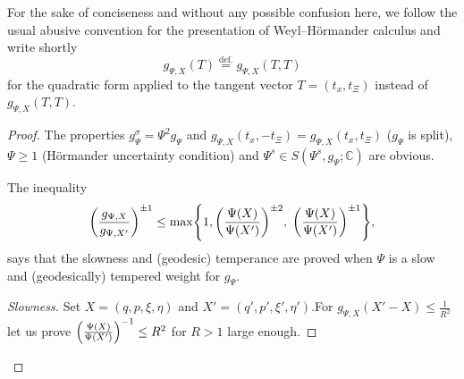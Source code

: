 \documentclass[10pt]{amsart}
\theoremstyle{definition}\newtheorem{defi}[theo]{Definition}\newtheorem{rema}[theo]{Remark}\newtheorem{exam}[theo]{Example}\newtheorem{exem}[theo]{Example}\newtheorem{nota}[theo]{Notation}
\newcommand{\C}{\mathbb{C}}
\let\originalleft\left
\let\originalright\right
\renewcommand{\left}{\mathopen{}\mathclose\bgroup\originalleft}
\renewcommand{\right}{\aftergroup\egroup\originalright}
\begin{document}
For the sake of conciseness and without any possible confusion here, we follow the usual abusive convention for the presentation of Weyl--H\"ormander calculus and write shortly
\[
g_{\Psi,X}(T)
\overset{\text{def.}}=g_{\Psi,X}(T,T)
\]
for the quadratic form applied to the tangent vector $T=(t_{x},t_{\Xi})$ instead of $g_{\Psi,X}(T,T)$.
\begin{proof}
The properties $g^{\sigma}_{\Psi}=\Psi^{2}g_{\Psi}$ and $g_{\Psi,X}(t_{x},-t_{\Xi})=g_{\Psi,X}(t_{x},t_{\Xi})$ ($g_{\Psi}$ is split), $\Psi\geq 1$ (H\"ormander uncertainty condition) and $\Psi^{s}\in S(\Psi^{s},g_{\Psi};\C)$ are obvious.

The inequality
\begin{equation}\label{eq:rappgXgXprime}
\left(\frac{g_{\Psi,X}}{g_{\Psi,X'}}\right)^{\pm 1}\leq \max \left\{1,\left(\frac{\Psi(X)}{\Psi(X')}\right)^{\pm 2},\; \left(\frac{\Psi(X)}{\Psi(X')}\right)^{\pm 1}\right\},
\end{equation}
says that the slowness and (geodesic) temperance are proved when $\Psi$ is a slow and (geodesically) tempered weight for $g_{\Psi}$.

\begin{proof}[{Slowness}]
Set $X=(q,p,\xi,\eta)$ and $X'=(q',p',\xi',\eta')$.For $g_{\Psi,X}(X'-X)\leq \frac{1}{R^{2}}$ let us prove $\left(\frac{\Psi(X)}{\Psi(X')}\right)^{-1}\leq R^{2}$ for $R>1$ large enough.


\end{proof}
\end{proof}
\end{document}
